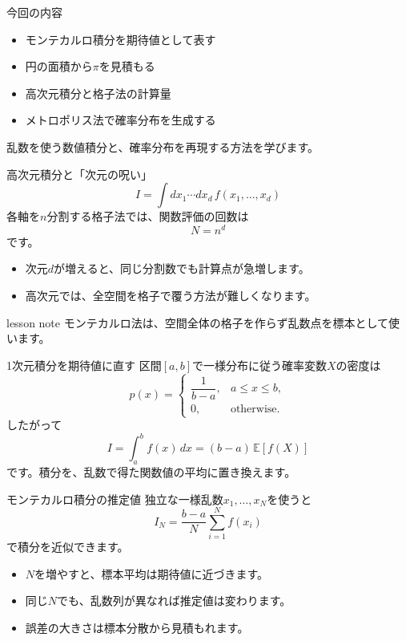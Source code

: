 \documentclass[12pt,aspectratio=43]{beamer}
\newenvironment{lessonbox}
  {\begin{beamercolorbox}[wd=\linewidth,sep=1.5mm]{lesson note}}
  {\end{beamercolorbox}\par}
\begin{document}
\begin{frame}[t]{今回の内容}
  \begin{itemize}
    \setlength{\itemsep}{3mm}
    \item モンテカルロ積分を期待値として表す
    \item 円の面積から$\pi$を見積もる
    \item 高次元積分と格子法の計算量
    \item メトロポリス法で確率分布を生成する
  \end{itemize}
  \vfill
  \small 乱数を使う数値積分と、確率分布を再現する方法を学びます。
\end{frame}

\begin{frame}[t]{高次元積分と「次元の呪い」}
  \[
    I=\int dx_1\cdots dx_d\,f(x_1,\ldots,x_d)
  \]
  各軸を$n$分割する格子法では、関数評価の回数は
  \[
    N=n^d
  \]
  です。
  \begin{itemize}
    \item 次元$d$が増えると、同じ分割数でも計算点が急増します。
    \item 高次元では、全空間を格子で覆う方法が難しくなります。
  \end{itemize}
  \begin{lessonbox}
    モンテカルロ法は、空間全体の格子を作らず乱数点を標本として使います。
  \end{lessonbox}
\end{frame}

\begin{frame}[t]{1次元積分を期待値に直す}
  区間$[a,b]$で一様分布に従う確率変数$X$の密度は
  \[
    p(x)=\begin{cases}\dfrac{1}{b-a},&a\leq x\leq b,\\0,&\text{otherwise.}\end{cases}
  \]
  したがって
  \[
    I=\int_a^b f(x)\,dx=(b-a)\,\mathbb{E}[f(X)]
  \]
  です。積分を、乱数で得た関数値の平均に置き換えます。
\end{frame}

\begin{frame}[t]{モンテカルロ積分の推定値}
  独立な一様乱数$x_1,\ldots,x_N$を使うと
  \[
    I_N=\frac{b-a}{N}\sum_{i=1}^{N}f(x_i)
  \]
  で積分を近似できます。
  \begin{itemize}
    \item $N$を増やすと、標本平均は期待値に近づきます。
    \item 同じ$N$でも、乱数列が異なれば推定値は変わります。
    \item 誤差の大きさは標本分散から見積もれます。
  \end{itemize}
\end{frame}
\end{document}
